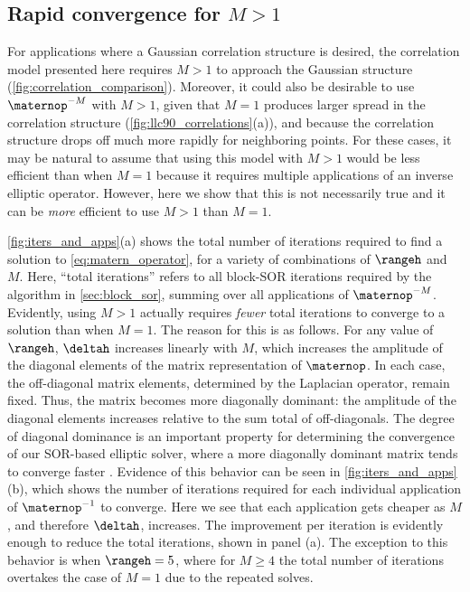 \documentclass[alpha-refs]{wiley-article}
\begin{document}
\subsection{Rapid convergence for $M>1$}
\label{ssec:iters_and_apps}

For applications where a Gaussian correlation structure is desired, the
correlation model presented here requires $M>1$ to approach the Gaussian
structure (\cref{fig:correlation_comparison}).
Moreover, it could also be desirable to use $\maternop^{-M}$ with $M>1$,
given that $M=1$ produces larger spread in the correlation structure
(\cref{fig:llc90_correlations}(a)), and because the correlation structure drops
off much more rapidly for neighboring points.
For these cases, it may be natural to assume that using this model with $M>1$
would be less efficient than when $M=1$ because it requires multiple
applications of an inverse elliptic operator.
However, here we show that this is not necessarily true and it can be
\textit{more} efficient to use $M>1$ than $M=1$.

\cref{fig:iters_and_apps}(a) shows the total number of iterations required to
find a solution to \cref{eq:matern_operator}, for a variety of combinations of
$\rangeh$ and $M$.
Here, ``total iterations'' refers to all block-SOR iterations
required by the algorithm in \cref{sec:block_sor}, summing over all applications
of $\maternop^{-M}$.
Evidently, using $M>1$ actually requires \textit{fewer} total iterations to converge to a
solution than when $M=1$.
The reason for this is as follows.
For any value of $\rangeh$, $\deltah$ increases linearly with $M$, which
increases the amplitude of the diagonal elements of the matrix representation of
$\maternop$.
In each case, the off-diagonal matrix elements, determined by the Laplacian
operator, remain fixed.
Thus, the matrix becomes more diagonally dominant:
the amplitude of the diagonal elements increases relative to the sum total of
off-diagonals.
The degree of diagonal dominance is an important property for
determining the convergence of our SOR-based elliptic solver, where a more
diagonally dominant matrix tends to converge faster \citep{golub_matrix_2013}.
Evidence of this behavior can be seen in \cref{fig:iters_and_apps}(b), which shows the
number of iterations required for each individual application of
$\maternop^{-1}$ to converge.
Here we see that each application gets cheaper as $M$, and therefore $\deltah$,
increases.
The improvement per iteration is evidently enough to reduce the total
iterations, shown in panel (a).
The exception to this behavior is when $\rangeh = 5$, where for $M\ge 4$
the total number of iterations overtakes the case of $M=1$ due to the repeated
solves.
\end{document}
